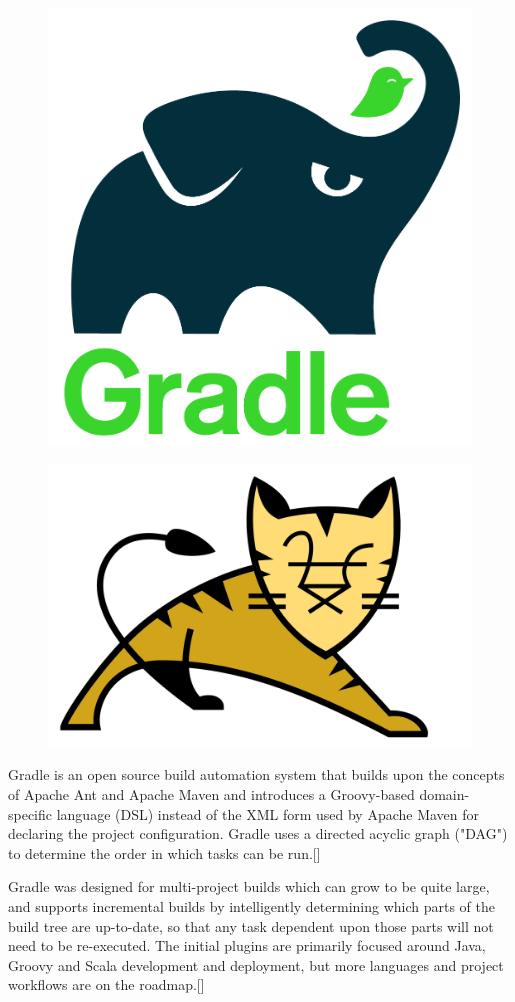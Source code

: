 \begin{figure}[h]
	\begin{minipage}{.5\textwidth}
		\centering
		\includegraphics[width=.5\linewidth]{images/gradlephant}
		\label{fig:gradle-logo}
	\end{minipage}%
	\begin{minipage}{.5\textwidth}
		\centering
		\includegraphics[width=.5\linewidth]{images/tomcat}
		\label{fig:tomcat-logo}
	\end{minipage}
\end{figure}

Gradle is an open source build automation system that builds upon the concepts of Apache Ant and Apache Maven and introduces a Groovy-based domain-specific language (DSL) instead of the XML form used by Apache Maven for declaring the project configuration. Gradle uses a directed acyclic graph ("DAG") to determine the order in which tasks can be run.[\cite{11}]
\newline

Gradle was designed for multi-project builds which can grow to be quite large, and supports incremental builds by intelligently determining which parts of the build tree are up-to-date, so that any task dependent upon those parts will not need to be re-executed.
The initial plugins are primarily focused around Java, Groovy and Scala development and deployment, but more languages and project workflows are on the roadmap.[\cite{11}]
\newline

